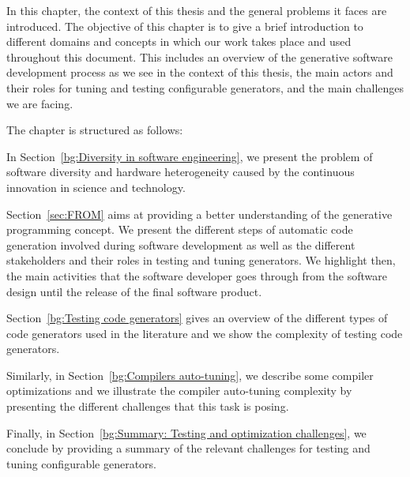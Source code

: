  
In this chapter, the context of this thesis and the general problems it faces are introduced. The objective of this chapter is to give a brief introduction to  different domains and concepts in which our work takes place and used throughout this document.
This includes an overview of the generative software development process as we see in the context of this thesis, the main actors and their roles for tuning and testing configurable generators, and the main challenges we are facing.


The chapter is structured as follows: 

In Section~\ref{bg:Diversity in software engineering}, we present the problem of software diversity and hardware heterogeneity caused by the continuous innovation in science and technology.

Section~\ref{sec:FROM} aims at providing a better understanding of the generative programming concept. We present the different steps of automatic code generation involved during software development as well as the different stakeholders and their roles in testing and tuning generators. We highlight then, the main activities that the software developer goes through from the software design until the release of the final software product.

Section~\ref{bg:Testing code generators} gives an overview of the different types of code generators used in the literature and we show the complexity of testing code generators.

Similarly, in Section~\ref{bg:Compilers auto-tuning}, we describe some compiler optimizations and we illustrate the compiler auto-tuning complexity by presenting the different challenges that this task is posing.

Finally, in Section~\ref{bg:Summary: Testing and optimization challenges}, we conclude by providing a summary of the relevant challenges for testing and tuning configurable generators.

